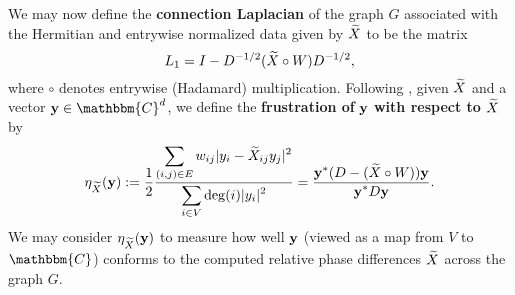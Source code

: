 
We may now define the \textbf{connection Laplacian} of the graph $G$ associated with the Hermitian and entrywise normalized data given by $\widetilde{X}$ to be the matrix 
\begin{equation}
L_1 = I - D^{-1/2} (\widetilde{X} \circ W) D^{-1/2},
\label{equ:ConnectLaplace}
\end{equation}
where $\circ$ denotes entrywise (Hadamard) multiplication.
Following \cite{Cheeger}, given $\widetilde{X}$ and a vector ${\bf y} \in \mathbbm{C}^d$, we  define the \textbf{frustration of} $\bf y$ \textbf{with respect to} $\widetilde{X}$ by \begin{equation} \eta_{\widetilde{X}}({\bf y}) := \frac{\displaystyle 1}{\displaystyle 2}\frac{\displaystyle \sum_{(i, j) \in E} w_{ij}|y_i - \widetilde{X}_{ij} y_j |^2}{\displaystyle \sum_{i \in V} \deg(i) |y_i|^2} = \frac{\displaystyle {\bf y}^* (D - (\widetilde{X} \circ W)) {\bf y}}{\displaystyle {\bf y}^* D {\bf y}}. \label{eq:frustration} \end{equation}
We may consider $\eta_{\widetilde{X}}({\bf y})$ to measure how well ${\bf y}$ (viewed as a map from $V$ to $\mathbbm{C}$) conforms to the computed relative phase differences $\widetilde{X}$ across the graph $G$. %

%

